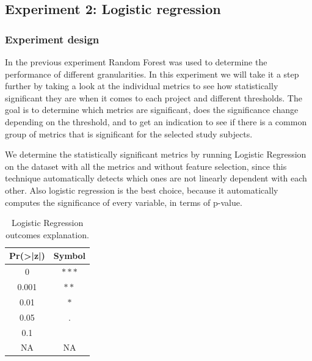 \subsection{Experiment 2: Logistic regression}

\subsubsection{Experiment design}

In the previous experiment Random Forest was used to determine the performance of different granularities. In this experiment we will take it a step further by taking a look at the individual metrics to see how statistically significant they are when it comes to each project and different thresholds. The goal is to determine which metrics are significant, does the significance change depending on the threshold, and to get an indication to see if there is a common group of metrics that is significant for the selected study subjects.

We determine the statistically significant metrics by running Logistic Regression on the dataset with all the metrics and without feature selection, since this technique automatically detects which ones are not linearly dependent with each other. Also logistic regression is the best choice, because it automatically computes the significance of every variable, in terms of p-value.


\begin{table}[ht]
\centering
\caption{Logistic Regression outcomes explanation.}
\label{tab:significant_sym}
\begin{tabular}{cc}
\hline
Pr(>|z|) & Symbol \\
\hline
0       & $\ast\ast\ast$      \\
0.001   & $\ast\ast$          \\
0.01    & $\ast$              \\
0.05    & .                   \\
0.1     &  \\
NA      & NA\\
\hline
\end{tabular}
\end{table}

